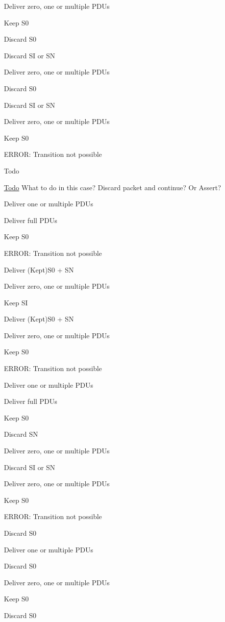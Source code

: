 Deliver zero, one or multiple P\+D\+Us

Keep S0

Discard S0

Discard SI or SN

Deliver zero, one or multiple P\+D\+Us

Discard S0

Discard SI or SN

Deliver zero, one or multiple P\+D\+Us

Keep S0

E\+R\+R\+OR\+: Transition not possible

\begin{DoxyRefDesc}{Todo}
\item[\hyperlink{todo__todo000094}{Todo}]What to do in this case? Discard packet and continue? Or Assert? \end{DoxyRefDesc}


Deliver one or multiple P\+D\+Us

Deliver full P\+D\+Us

Keep S0

E\+R\+R\+OR\+: Transition not possible

Deliver (Kept)S0 + SN

Deliver zero, one or multiple P\+D\+Us

Keep SI

Deliver (Kept)S0 + SN

Deliver zero, one or multiple P\+D\+Us

Keep S0

E\+R\+R\+OR\+: Transition not possible

Deliver one or multiple P\+D\+Us

Deliver full P\+D\+Us

Keep S0

Discard SN

Deliver zero, one or multiple P\+D\+Us

Discard SI or SN

Deliver zero, one or multiple P\+D\+Us

Keep S0

E\+R\+R\+OR\+: Transition not possible

Discard S0

Deliver one or multiple P\+D\+Us

Discard S0

Deliver zero, one or multiple P\+D\+Us

Keep S0

Discard S0

